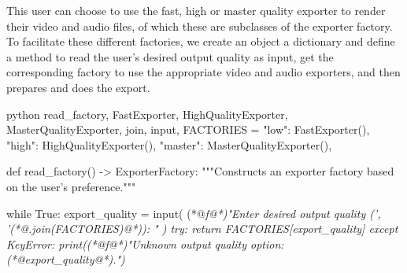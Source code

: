 This user can choose to use the fast, high or master quality exporter to render their video and audio files, of which these are subclasses of the exporter factory. To facilitate these different factories, we create an object a dictionary  and define a method  to read the user's desired output quality as input, get the corresponding factory to use the appropriate video and audio exporters, and then prepares and does the export.

\begin{monokai}{python}{
	read_factory,
	FastExporter,
	HighQualityExporter,
	MasterQualityExporter,
	join,
	input,
}
  FACTORIES = {
      "low": FastExporter(),
      "high": HighQualityExporter(),
      "master": MasterQualityExporter(),
  }
  
  def read_factory() -> ExporterFactory:
      """Constructs an exporter factory based on the user's preference."""
       
      while True:
          export_quality = input(
              (*@\slshape\color{monokai-blue}f@*)"Enter desired output quality ({', '(*@\color{monokai-grey-200}.\color{monokai-green}join\color{monokai-grey-200}(\color{monokai-blue}FACTORIES\color{monokai-grey-200})@*)}): "
          )
          try:
              return FACTORIES[export_quality]
          except KeyError:
              print((*@\slshape\color{monokai-blue}f@*)"Unknown output quality option: {(*@\color{white}export_quality@*)}.")
\end{monokai}
